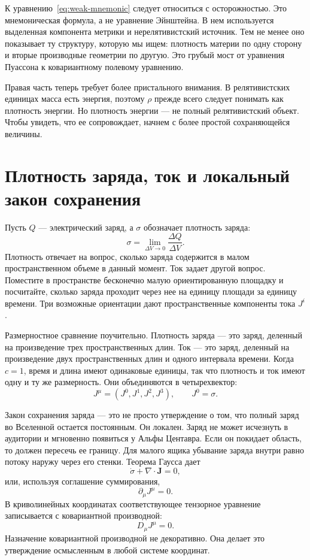 К уравнению~\eqref{eq:weak-mnemonic} следует относиться с осторожностью. Это мнемоническая формула, а не уравнение Эйнштейна. В нем используется выделенная компонента метрики и нерелятивистский источник. Тем не менее оно показывает ту структуру, которую мы ищем: плотность материи по одну сторону и вторые производные геометрии по другую. Это грубый мост от уравнения Пуассона к ковариантному полевому уравнению.

Правая часть теперь требует более пристального внимания. В релятивистских единицах масса есть энергия, поэтому \(\rho\) прежде всего следует понимать как плотность энергии. Но плотность энергии — не полный релятивистский объект. Чтобы увидеть, что ее сопровождает, начнем с более простой сохраняющейся величины.

\section{Плотность заряда, ток и локальный закон сохранения}

Пусть \(Q\) — электрический заряд, а \(\sigma\) обозначает плотность заряда:
\begin{equation}
 \sigma=\lim_{\Delta V\to0}\frac{\Delta Q}{\Delta V}.
\end{equation}
Плотность отвечает на вопрос, сколько заряда содержится в малом пространственном объеме в данный момент. Ток задает другой вопрос. Поместите в пространстве бесконечно малую ориентированную площадку и посчитайте, сколько заряда проходит через нее на единицу площади за единицу времени. Три возможные ориентации дают пространственные компоненты тока \(J^i\).

Размерностное сравнение поучительно. Плотность заряда — это заряд, деленный на произведение трех пространственных длин. Ток — это заряд, деленный на произведение двух пространственных длин и одного интервала времени. Когда \(c=1\), время и длина имеют одинаковые единицы, так что плотность и ток имеют одну и ту же размерность. Они объединяются в четырехвектор:
\begin{equation}
 J^\mu=(J^0,J^1,J^2,J^3),
 \qquad J^0=\sigma.
\end{equation}

Закон сохранения заряда — это не просто утверждение о том, что полный заряд во Вселенной остается постоянным. Он локален. Заряд не может исчезнуть в аудитории и мгновенно появиться у Альфы Центавра. Если он покидает область, то должен пересечь ее границу. Для малого ящика убывание заряда внутри равно потоку наружу через его стенки. Теорема Гаусса дает
\begin{equation}
 \dot{\sigma}+\nabla\cdot\mathbf{J}=0,
\end{equation}
или, используя соглашение суммирования,
\begin{equation}
 \partial_\mu J^\mu=0.
 \label{eq:charge-continuity}
\end{equation}
В криволинейных координатах соответствующее тензорное уравнение записывается с ковариантной производной:
\begin{equation}
 D_\mu J^\mu=0.
\end{equation}
Назначение ковариантной производной не декоративно. Она делает это утверждение осмысленным в любой системе координат.

